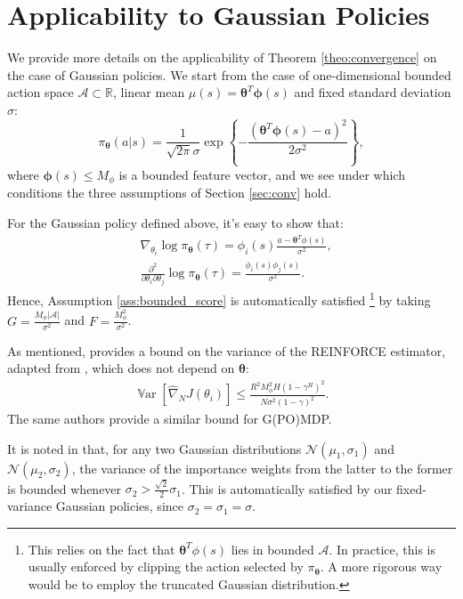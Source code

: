 \documentclass{article}
\theoremstyle{remark}
\theoremstyle{definition}
\DeclareMathOperator*{\Var}{\mathbb{V}ar}
\newcommand{\vtheta}{\boldsymbol{\theta}}
\newcommand{\Aspace}{\mathcal{A}}
\newcommand{\vphi}{\boldsymbol{\phi}}
\newcommand{\gradApp}[2]{\widehat{\nabla}_{#2}J(#1)}
\newcommand{\GRADLOG}{G}
\newcommand{\HESSLOG}{F}
\begin{document}
\section{Applicability to Gaussian Policies}\label{app:gauss}
We provide more details on the applicability of Theorem \ref{theo:convergence} on the case of Gaussian policies. We start from the case of one-dimensional bounded action space $\mathcal{A}\subset\mathbb{R}$, linear mean $\mu(s) = \vtheta^T\vphi(s)$ and fixed standard deviation $\sigma$:
\[
	\pi_{\vtheta}(a\vert s) = \frac{1}{\sqrt{2\pi}\sigma}\exp\left\{
		-\frac{(\vtheta^T\vphi(s) - a)^2}{2\sigma^2}\right\},
\]
where $\vphi(s)\leq M_{\phi}$ is a bounded feature vector, and we see under which conditions the three assumptions of Section \ref{sec:conv} hold.

\boundedscore*
For the Gaussian policy defined above, it's easy to show that:
\begin{align*}
	&\nabla_{\theta_i}\log\pi_{\vtheta}(\tau) =  \phi_i(s)\frac{a-\vtheta^T\phi(s)}{\sigma^2},\\
	&\frac{\partial^2}{\partial\theta_i\partial\theta_j}\log\pi_{\vtheta}(\tau) = \frac{\phi_i(s)\phi_j(s)}{\sigma^2}.
\end{align*}
Hence, Assumption \ref{ass:bounded_score} is automatically satisfied \footnote{This relies on the fact that $\vtheta^T\phi(s)$ lies in bounded $\Aspace$. In practice, this is usually enforced by clipping the action selected by $\pi_{\vtheta}$. A more rigorous way would be to employ the truncated Gaussian distribution.} by taking $\GRADLOG = \frac{M_{\phi}|\Aspace|}{\sigma^2}$ and $\HESSLOG = \frac{M_{\phi}^2}{\sigma^2}$.
\par
\varreinforce*
As mentioned, \cite{pirotta2013adaptive} provides a bound on the variance of the REINFORCE estimator, adapted from \cite{zhao2011analysis}, which does not depend on $\vtheta$:
\begin{align*}
\Var\left[\gradApp{\theta_i}{N}\right] \leq \frac{R^2M_{\phi}^2H(1-\gamma^H)^2}{N\sigma^2(1-\gamma)^2}.
\end{align*}
The same authors provide a similar bound for G(PO)MDP.

\varweights*
It is noted in \cite{cortes2010learning} that, for any two Gaussian distributions $\mathcal{N}(\mu_1,\sigma_1)$ and $\mathcal{N}(\mu_2,\sigma_2)$, the variance of the importance weights from the latter to the former is bounded whenever $\sigma_2 > \frac{\sqrt{2}}{2}\sigma_1$. This is automatically satisfied by our fixed-variance Gaussian policies, since $\sigma_2=\sigma_1=\sigma$.
\end{document}
